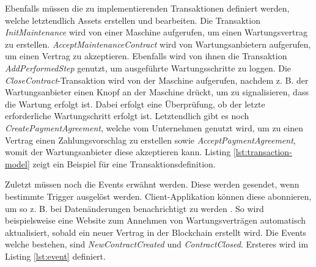 Ebenfalls müssen die zu implementierenden Transaktionen definiert werden, welche letztendlich Assets erstellen und bearbeiten. Die Transaktion \textit{InitMaintenance} wird von einer Maschine aufgerufen, um einen Wartungsvertrag zu erstellen. \textit{AcceptMaintenanceContract} wird von Wartungsanbietern aufgerufen, um einen Vertrag zu akzeptieren. Ebenfalls wird von ihnen die Transaktion \textit{AddPerformedStep} genutzt, um ausgeführte Wartungsschritte zu loggen. Die \textit{CloseContract}-Transaktion wird von der Maschine aufgerufen, nachdem z. B. der Wartungsanbieter einen Knopf an der Maschine drückt, um zu signalisieren, dass die Wartung erfolgt ist. Dabei erfolgt eine Überprüfung, ob der letzte erforderliche Wartungschritt erfolgt ist. Letztendlich gibt es noch \textit{CreatePaymentAgreement}, welche vom Unternehmen genutzt wird, um zu einen Vertrag einen Zahlungsvorschlag zu erstellen sowie \textit{AcceptPaymentAgreement}, womit der Wartungsanbieter diese akzeptieren kann. Listing \ref{lst:transaction-model} zeigt ein Beispiel für eine Transaktionsdefinition.


Zuletzt müssen noch die Events erwähnt werden. Diese werden gesendet, wenn bestimmte Trigger ausgelöst werden. Client-Applikation können diese abonnieren, um so z. B. bei Datenänderungen benachrichtigt zu werden \cite{HyperledgerComposerTeamEmittingEventsHyperledger}. So wird beispielsweise eine Website zum Annehmen von Wartungsverträgen automatisch aktualisiert, sobald ein neuer Vertrag in der Blockchain erstellt wird. Die Events welche bestehen, sind \textit{NewContractCreated} und \textit{ContractClosed}. Ersteres wird im Listing \ref{lst:event} definiert. 


